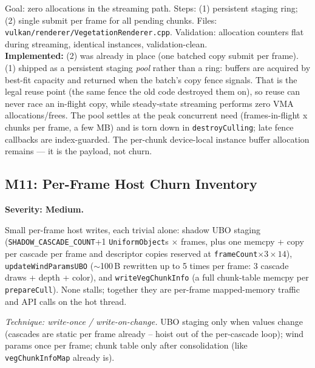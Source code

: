 \documentclass[11pt,a4paper]{article}
\begin{document}
\begin{tcolorbox}[promptbox={Prompt --- M10: batch vegetation uploads}]
Goal: zero allocations in the streaming path. Steps: (1) persistent
staging ring; (2) single submit per frame for all pending chunks. Files:
\texttt{vulkan/renderer/VegetationRenderer.cpp}. Validation: allocation
counters flat during streaming, identical instances, validation-clean.
\\ \textbf{Implemented:} (2) was already in place (one batched copy submit
per frame). (1) shipped as a persistent staging \emph{pool} rather than a
ring: buffers are acquired by best-fit capacity and returned when the
batch's copy fence signals. That is the legal reuse point (the same fence
the old code destroyed them on), so reuse can never race an in-flight
copy, while steady-state streaming performs zero VMA allocations/frees.
The pool settles at the peak concurrent need (frames-in-flight x chunks
per frame, a few MB) and is torn down in \texttt{destroyCulling}; late
fence callbacks are index-guarded. The per-chunk device-local instance
buffer allocation remains --- it is the payload, not churn.
\end{tcolorbox}

\subsection{M11: Per-Frame Host Churn Inventory}
\label{sec:m11}

\textbf{Severity: Medium.}

Small per-frame host writes, each trivial alone: shadow UBO staging
(\texttt{SHADOW\_CASCADE\_COUNT}+1 \texttt{UniformObject}s $\times$ frames,
plus one memcpy + copy per cascade per frame and descriptor copies reserved
at \texttt{frameCount}$\times 3 \times 14$), \texttt{updateWindParamsUBO}
($\sim$100\,B rewritten up to 5 times per frame: 3 cascade draws + depth +
color), and \texttt{writeVegChunkInfo} (a full chunk-table memcpy per
\texttt{prepareCull}). None stalls; together they are per-frame mapped-memory
traffic and API calls on the hot thread.

\textit{Technique: write-once / write-on-change.} UBO staging only when
values change (cascades are static per frame already -- hoist out of the
per-cascade loop); wind params once per frame; chunk table only after
consolidation (like \texttt{vegChunkInfoMap} already is).
\end{document}
